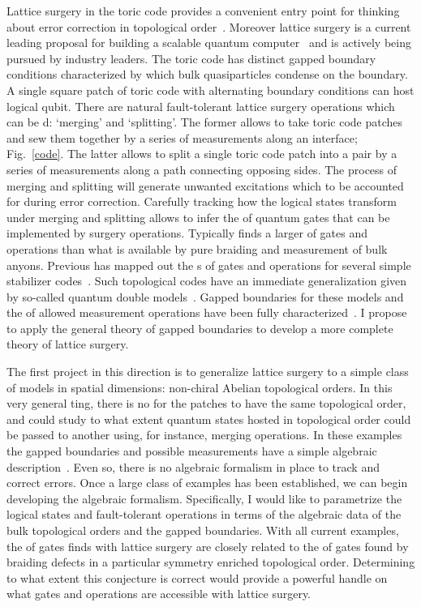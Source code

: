 Lattice surgery in the toric code provides a convenient entry point for thinking about error correction in topological order~\cite{Horsman2012,Fowler2019}.
Moreover lattice surgery is a current leading proposal for building a scalable quantum computer~\cite{Horsman2012} and is actively being pursued by industry leaders.
The toric code has  distinct gapped boundary conditions characterized by which bulk quasiparticles condense on the boundary.
A single square patch of toric code with alternating boundary conditions can host  logical qubit.
There are  natural fault-tolerant lattice surgery operations which can be d: `merging' and `splitting'. 
The former allows  to take  toric code patches and sew them together by a series of measurements along an interface;  Fig.~\ref{code}. 
The latter allows  to split a single toric code patch into a pair by a series of measurements along a path connecting opposing sides.
The process of merging and splitting will generate unwanted excitations which  to be accounted for during error correction.
Carefully tracking how the logical states transform under merging and splitting allows  to infer the  of quantum gates that can be implemented by surgery operations.
Typically  finds a larger  of gates and operations than what is available by pure braiding and measurement of bulk anyons.
Previous  has mapped out the s of gates and operations for several simple stabilizer codes~\cite{Horsman2012,Fowler2019,Landahl2014}. 
Such topological codes have an immediate generalization given by so-called quantum double models~\cite{Kitaev2003}. 
Gapped boundaries for these models and the  of allowed measurement operations have  been fully characterized~\cite{Kitaev2012,Cong2016,Beigi2011,Etingof2009}.
I propose to apply the general theory of gapped boundaries to develop a more complete theory of lattice surgery.


The first project in this direction is to generalize lattice surgery to a simple class of models in  spatial dimensions: non-chiral Abelian topological orders. 
In this very general ting, there is no  for the patches to have the same topological order, and  could study to what extent quantum states hosted in  topological order could be passed to another using, for instance, merging operations.
In these examples the gapped boundaries and possible measurements have a simple algebraic description~\cite{Beigi2011}.
Even so, there is no algebraic formalism in place to track and correct errors.
Once a large class of examples has been established, we can begin developing the algebraic formalism.
Specifically, I would like to parametrize the logical states and fault-tolerant operations in terms of the algebraic data of the bulk topological orders and the gapped boundaries. 
With all current examples, the  of gates  finds with lattice surgery are closely related to the  of gates found by braiding defects in a particular symmetry enriched topological order. 
Determining to what extent this conjecture is correct would provide a powerful handle on what gates and operations are accessible with lattice surgery.


